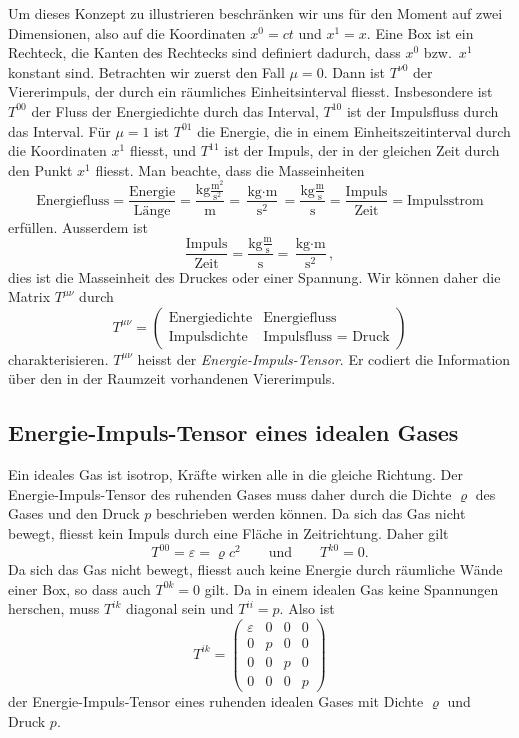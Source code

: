 Um dieses Konzept zu illustrieren beschränken wir uns für den Moment
auf zwei Dimensionen, also auf die Koordinaten $x^0=ct$ und $x^1=x$.
Eine Box ist ein Rechteck, die Kanten des Rechtecks sind definiert
dadurch, dass $x^0$ bzw.~$x^1$ konstant sind.
Betrachten wir zuerst den Fall $\mu=0$.
Dann ist $T^{\nu0}$ der Viererimpuls, der durch ein räumliches
Einheitsinterval fliesst.
Insbesondere ist $T^{00}$ der Fluss der Energiedichte durch das Interval,
$T^{10}$ ist der Impulsfluss durch das Interval.
Für $\mu=1$ ist $T^{01}$ die Energie, die in einem Einheitszeitinterval
durch die Koordinaten $x^1$ fliesst, und $T^{11}$ ist der Impuls, der in der
gleichen Zeit durch den Punkt $x^1$ fliesst.
Man beachte, dass die Masseinheiten
\[
\text{Energiefluss}
=
\frac{\text{Energie}}{\text{Länge}}
=
\frac{\text{kg}\frac{\text{m}^2}{\text{s}^2}}{\text{m}}
=
\frac{\text{kg}\cdot\text{m}}{\text{s}^2}
=
\frac{\text{kg}\frac{\text{m}}{\text{s}}}{\text{s}}
=
\frac{\text{Impuls}}{\text{Zeit}}
=
\text{Impulsstrom}
\]
erfüllen.
Ausserdem ist 
\[
\frac{\text{Impuls}}{\text{Zeit}}
=
\frac{\text{kg}\frac{\text{m}}{\text{s}}}{\text{s}}
=
\frac{\text{kg}\cdot\text{m}}{\text{s}^2},
\]
dies ist die Masseinheit des Druckes oder einer Spannung.
Wir können daher die Matrix $T^{\mu\nu}$
durch
\[
T^{\mu\nu}
=
\begin{pmatrix}
\text{Energiedichte}
&\text{Energiefluss}
\\
\text{Impulsdichte}
&\text{Impulsfluss = Druck}
\end{pmatrix}
\]
charakterisieren.
$T^{\mu\nu}$ heisst der {\em Energie-Impuls-Tensor}.
Er codiert die Information über den in der Raumzeit vorhandenen
Viererimpuls.

%

\subsection{Energie-Impuls-Tensor eines idealen Gases%
\label{skript:speziell:subsection:idealesgas}}
Ein ideales Gas ist isotrop, Kräfte wirken alle in die gleiche
Richtung.
Der Energie-Impuls-Tensor des ruhenden Gases muss daher durch die
Dichte $\varrho$ des Gases und den Druck $p$ beschrieben werden können.
Da sich das Gas nicht bewegt, fliesst kein Impuls durch eine Fläche
in Zeitrichtung.
Daher gilt
\[
T^{00}
=
\varepsilon
=
\varrho c^2
\qquad
\text{und}
\qquad
T^{k0}
=
0.
\]
Da sich das Gas nicht bewegt, fliesst auch keine Energie durch räumliche
Wände einer Box, so dass auch $T^{0k}=0$ gilt.
Da in einem idealen Gas keine Spannungen herschen, muss $T^{ik}$ diagonal
sein und $T^{ii}=p$.
Also ist
\[
T^{ik}
=
\begin{pmatrix}
\varepsilon&0&0&0\\
0&p&0&0\\
0&0&p&0\\
0&0&0&p
\end{pmatrix}
\]
der Energie-Impuls-Tensor eines ruhenden idealen Gases mit Dichte
$\varrho$ und Druck $p$.
%

